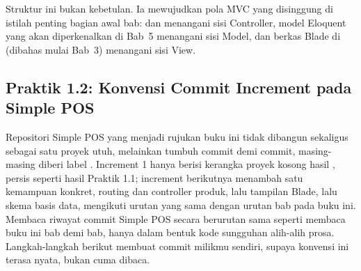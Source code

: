 Struktur ini bukan kebetulan. Ia mewujudkan pola MVC yang disinggung di
istilah penting bagian awal bab:  dan
 menangani sisi Controller, model Eloquent yang
akan diperkenalkan di Bab~5 menangani sisi Model, dan berkas Blade di
 (dibahas mulai Bab~3) menangani sisi View.

\subsection*{Praktik 1.2: Konvensi Commit Increment pada Simple POS}

Repositori Simple POS yang menjadi rujukan buku ini tidak dibangun sekaligus
sebagai satu proyek utuh, melainkan tumbuh commit demi commit, masing-masing
diberi label . Increment 1 hanya berisi kerangka proyek
kosong hasil , persis seperti hasil Praktik
1.1; increment berikutnya menambah satu kemampuan konkret, routing dan
controller produk, lalu tampilan Blade, lalu skema basis data, mengikuti
urutan yang sama dengan urutan bab pada buku ini. Membaca riwayat commit
Simple POS secara berurutan sama seperti membaca buku ini bab demi bab,
hanya dalam bentuk kode sungguhan alih-alih prosa. Langkah-langkah berikut
membuat commit  milikmu sendiri, supaya konvensi ini
terasa nyata, bukan cuma dibaca.

